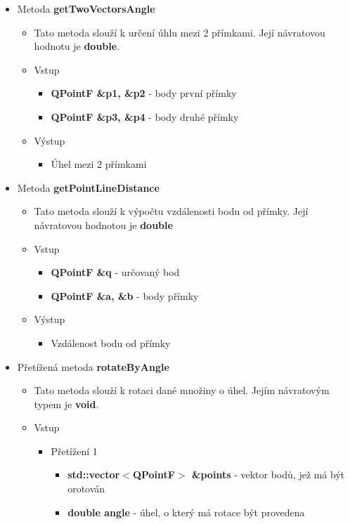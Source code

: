 \documentclass[a4paper, 12pt]{article}
\begin{document}
\begin{itemize}
	\item Metoda \textbf{getTwoVectorsAngle}
		\begin{itemize}
			\item Tato metoda slouží k určení úhlu mezi 2 přímkami. Její návratovou hodnotu je \textbf{double}.
			\item Vstup
				\begin{itemize}
					\item \textbf{QPointF \&p1, \&p2} - body první přímky
					\item \textbf{QPointF \&p3, \&p4} - body druhé přímky
				\end{itemize}
		
			\item Výstup
				\begin{itemize}
					\item Úhel mezi 2 přímkami
				\end{itemize}			
		\end{itemize}

	\item Metoda \textbf{getPointLineDistance}
		\begin{itemize}
			\item Tato metoda slouží k výpočtu vzdálenosti bodu od přímky. Její návratovou hodnotou je \textbf {double} %
			\item Vstup
				\begin{itemize}
					\item \textbf{QPointF \&q} - určovaný bod
					\item \textbf{QPointF \&a, \&b} - body přímky
				\end{itemize}
			\item Výstup
				\begin{itemize}
					\item Vzdálenost bodu od přímky
				\end{itemize}
		\end{itemize}

	\item Přetížená metoda \textbf{rotateByAngle}
		\begin{itemize}
			\item Tato metoda slouží k rotaci dané množiny o úhel. Jejím návratovým typem je \textbf{void}.
			\item Vstup
				\begin{itemize}
					\item Přetížení 1
						\begin{itemize}
							\item \textbf{std::vector$<$QPointF$>$ \&points} - vektor bodů, jež má být orotován
							\item \textbf{double angle} - úhel, o který má rotace být provedena
 						\end{itemize}
					

\end{itemize}
\end{itemize}
\end{itemize}
\end{document}
